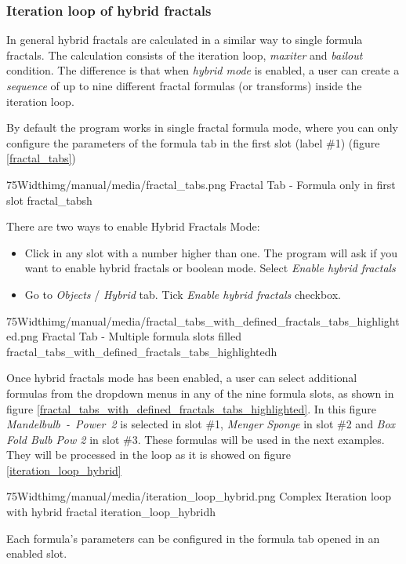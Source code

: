 \subsubsection{Iteration loop of hybrid fractals}

In general hybrid fractals are calculated in a similar way to single formula fractals.
The calculation consists of the iteration loop, \emph{maxiter} and \emph{bailout} condition. The
difference is that when \emph{hybrid mode} is enabled, a user can create a \emph{sequence} of up to nine different fractal formulas (or transforms) inside the iteration loop. 

By default the program works in single fractal formula mode, where you can only configure the parameters of the formula tab in the first slot (label \#1) (figure \ref{fractal_tabs})

\simpleImageWithCaption75Width{img/manual/media/fractal_tabs.png}
{Fractal Tab - Formula only in first slot}
{fractal_tabs}{h}

There are two ways to enable Hybrid Fractals Mode:
\begin{itemize}
	\item Click in any slot with a number higher than one. The program will ask if you want to
	enable hybrid fractals or boolean mode. Select \emph{Enable hybrid fractals}
	\item Go to \emph{Objects} / \emph{Hybrid} tab. Tick \emph{Enable hybrid fractals} checkbox.
\end{itemize}

\simpleImageWithCaption75Width{img/manual/media/fractal_tabs_with_defined_fractals_tabs_highlighted.png}
{Fractal Tab - Multiple formula slots filled}
{fractal_tabs_with_defined_fractals_tabs_highlighted}{h}

Once hybrid fractals mode has been enabled, a user can select additional formulas from the dropdown menus in any of the nine formula slots,
as shown in figure \ref{fractal_tabs_with_defined_fractals_tabs_highlighted}.
In this figure \emph{Mandelbulb~-~Power~2} is selected in slot \#1, \emph{Menger Sponge}
in slot \#2 and \emph{Box Fold Bulb Pow 2} in slot \#3. These formulas will be
used in the next examples. They will be processed in the loop as it is showed on figure \ref{iteration_loop_hybrid}

\simpleImageWithCaption75Width{img/manual/media/iteration_loop_hybrid.png}
{Complex Iteration loop with hybrid fractal}
{iteration_loop_hybrid}{h}

Each formula's parameters can be configured in the formula tab opened in an enabled slot.

